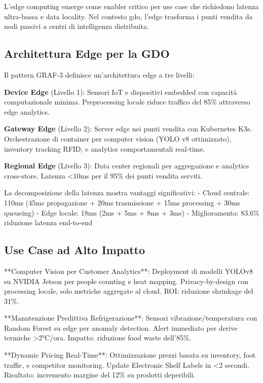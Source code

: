 L'edge computing emerge come enabler critico per use case che richiedono latenza ultra-bassa e data locality. Nel contesto \gls{gdo}, l'edge trasforma i punti vendita da nodi passivi a centri di intelligenza distribuita.

\subsection{\texorpdfstring{Architettura Edge per la GDO}{3.4.1 - Architettura Edge per la GDO}}

Il pattern GRAF-3 definisce un'architettura edge a tre livelli:

\textbf{Device Edge} (Livello 1): Sensori IoT e dispositivi embedded con capacità computazionale minima. Preprocessing locale riduce traffico del 85\% attraverso edge analytics.

\textbf{Gateway Edge} (Livello 2): Server edge nei punti vendita con Kubernetes K3s. Orchestrazione di container per computer vision (YOLO v8 ottimizzato), inventory tracking RFID, e analytics comportamentali real-time.

\textbf{Regional Edge} (Livello 3): Data center regionali per aggregazione e analytics cross-store. Latenza <10ms per il 95\% dei punti vendita serviti.

La decomposizione della latenza mostra vantaggi significativi:
- Cloud centrale: 110ms (45ms propagazione + 20ms trasmissione + 15ms processing + 30ms queueing)
- Edge locale: 18ms (2ms + 5ms + 8ms + 3ms)
- Miglioramento: 83.6\% riduzione latenza end-to-end

\subsection{\texorpdfstring{Use Case ad Alto Impatto}{3.4.2 - Use Case ad Alto Impatto}}

**Computer Vision per Customer Analytics**: Deployment di modelli YOLOv8 su NVIDIA Jetson per people counting e heat mapping. Privacy-by-design con processing locale, solo metriche aggregate al cloud. ROI: riduzione shrinkage del 31\%.

**Manutenzione Predittiva Refrigerazione**: Sensori vibrazione/temperatura con Random Forest su edge per anomaly detection. Alert immediato per derive termiche >2°C/ora. Impatto: riduzione food waste dell'85\%.

**Dynamic Pricing Real-Time**: Ottimizzazione prezzi basata su inventory, foot traffic, e competitor monitoring. Update Electronic Shelf Labels in <2 secondi. Risultato: incremento margine del 12\% su prodotti deperibili.

